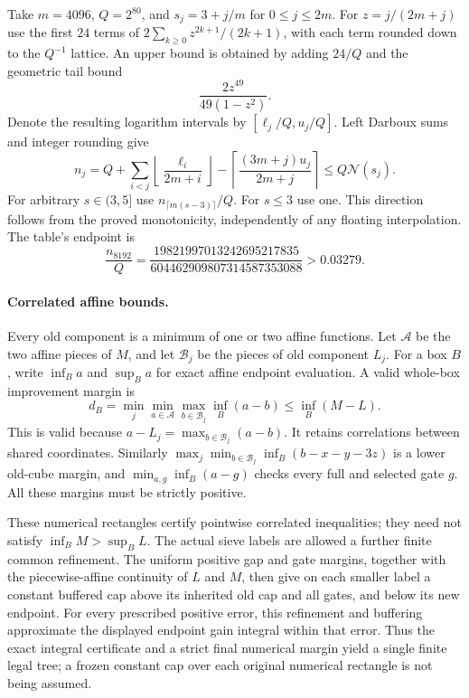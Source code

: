 \documentclass[11pt]{article}
\begin{document}
Take $m=4096$, $Q=2^{80}$, and $s_j=3+j/m$ for $0\le j\le2m$.
For $z=j/(2m+j)$ use the first $24$ terms of
$2\sum_{k\ge0}z^{2k+1}/(2k+1)$, with each term rounded down to
the $Q^{-1}$ lattice.  An upper bound is obtained by adding
$24/Q$ and the geometric tail bound
\[
 \frac{2z^{49}}{49(1-z^2)}.
\]
Denote the resulting logarithm intervals by
$[\ell_j/Q,u_j/Q]$.  Left Darboux sums and integer rounding give
\[
 n_j=Q+\sum_{i<j}\left\lfloor\frac{\ell_i}{2m+i}\right\rfloor
       -\left\lceil\frac{(3m+j)u_j}{2m+j}\right\rceil
 \le Q\mathcal N(s_j).
\]
For arbitrary $s\in(3,5]$ use $n_{\lceil m(s-3)\rceil}/Q$.
For $s\le3$ use one.  This direction follows from the proved
monotonicity, independently of any floating interpolation.
The table's endpoint is
\[
 \frac{n_{8192}}Q
 =\frac{19821997013242695217835}{604462909807314587353088}
 >0.03279.
\]

\paragraph{Correlated affine bounds.}
Every old component is a minimum of one or two affine functions.
Let $\mathcal A$ be the two affine pieces of $M$, and let
$\mathcal B_j$ be the pieces of old component $L_j$.
For a box $B$, write $\inf_B a$ and $\sup_B a$ for exact affine
endpoint evaluation.  A valid whole-box improvement margin is
\[
 d_B=\min_j\min_{a\in\mathcal A}
                 \max_{b\in\mathcal B_j}\inf_B(a-b)
 \le\inf_B(M-L).
\]
This is valid because $a-L_j=\max_{b\in\mathcal B_j}(a-b)$.
It retains correlations between shared coordinates.  Similarly
$\max_j\min_{b\in\mathcal B_j}\inf_B(b-x-y-3z)$ is a lower
old-cube margin, and $\min_{a,g}\inf_B(a-g)$ checks every full
and selected gate $g$.  All these margins must be strictly positive.

These numerical rectangles certify pointwise correlated inequalities;
they need not satisfy $\inf_B M>\sup_B L$.  The actual sieve labels
are allowed a further finite common refinement.  The uniform positive
gap and gate margins, together with the piecewise-affine continuity of
$L$ and $M$, then give on each smaller label a constant buffered cap
above its inherited old cap and all gates, and below its new endpoint.
For every prescribed positive error, this refinement and buffering
approximate the displayed endpoint gain integral within that error.
Thus the exact integral certificate and a strict final numerical
margin yield a single finite legal tree; a frozen constant cap over
each original numerical rectangle is not being assumed.
\end{document}

